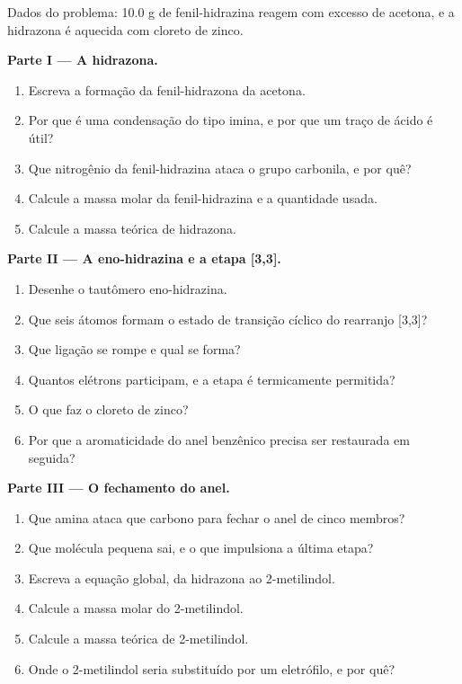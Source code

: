 \begin{problem}
\label{pb:b3:heterocycles:1}
Dados do problema: 10.0 g de fenil-hidrazina reagem com excesso de acetona, e
a hidrazona é aquecida com cloreto de zinco.

\medskip\noindent\textbf{Parte I --- A hidrazona.}
\begin{enumerate}
  \item Escreva a formação da fenil-hidrazona da acetona.
  \item Por que é uma condensação do tipo imina, e por que um traço de ácido é útil?
  \item Que nitrogênio da fenil-hidrazina ataca o grupo carbonila, e por quê?
  \item Calcule a massa molar da fenil-hidrazina e a quantidade usada.
  \item Calcule a massa teórica de hidrazona.
\end{enumerate}

\medskip\noindent\textbf{Parte II --- A eno-hidrazina e a etapa [3,3].}
\begin{enumerate}[resume]
  \item Desenhe o tautômero eno-hidrazina.
  \item Que seis átomos formam o estado de transição cíclico do rearranjo [3,3]?
  \item Que ligação se rompe e qual se forma?
  \item Quantos elétrons participam, e a etapa é termicamente permitida?
  \item O que faz o cloreto de zinco?
  \item Por que a aromaticidade do anel benzênico precisa ser restaurada em seguida?
\end{enumerate}

\medskip\noindent\textbf{Parte III --- O fechamento do anel.}
\begin{enumerate}[resume]
  \item Que amina ataca que carbono para fechar o anel de cinco membros?
  \item Que molécula pequena sai, e o que impulsiona a última etapa?
  \item Escreva a equação global, da hidrazona ao 2-metilindol.
  \item Calcule a massa molar do 2-metilindol.
  \item Calcule a massa teórica de 2-metilindol.
  \item Onde o 2-metilindol seria substituído por um eletrófilo, e por quê?
\end{enumerate}


\end{problem}
